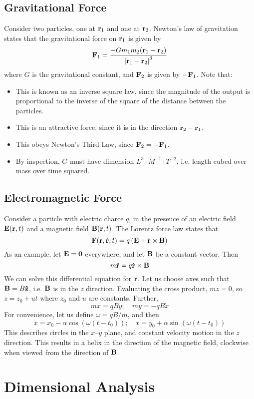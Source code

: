 \documentclass{article}
\begin{document}
\subsection{Gravitational Force}
Consider two particles, one at $\vb r_1$ and one at $\vb r_2$. Newton's law of gravitation states that the gravitational force on $\vb r_1$ is given by
\[ \vb F_1 = \frac{- G m_1 m_2 (\vb r_1 - \vb r_2)}{\abs{\vb r_1 - \vb r_2}^3} \]
where $G$ is the gravitational constant, and $\vb F_2$ is given by $-\vb F_1$. Note that:
\begin{itemize}
    \item This is known as an inverse square law, since the magnitude of the output is proportional to the inverse of the square of the distance between the particles.
    \item This is an attractive force, since it is in the direction $\vb r_2 - \vb r_1$.
    \item This obeys Newton's Third Law, since $\vb F_2 = - \vb F_1$.
    \item By inspection, $G$ must have dimension $L^3 \cdot M^{-1} \cdot T^{-2}$, i.e. length cubed over mass over time squared.
\end{itemize}

\subsection{Electromagnetic Force}
Consider a particle with electric charce $q$, in the presence of an electric field $\vb E(\vb r, t)$ and a magnetic field $\vb B(\vb r, t)$. The Lorentz force law states that
\[ \vb F(\vb r, \dot{\vb r}, t) = q\left( \vb E + \dot{\vb r} \times \vb B \right) \]
As an example, let $\vb E = \vb 0$ everywhere, and let $\vb B$ be a constant vector. Then
\[ m \ddot{\vb r} = q \dot{\vb r} \times \vb B \]
We can solve this differential equation for $\vb r$. Let us choose axes such that $\vb B = B \vu{z}$, i.e. $\vb B$ is in the $z$ direction. Evaluating the cross product, $m \ddot{z} = 0$, so $z = z_0 + ut$ where $z_0$ and $u$ are constants. Further,
\[ m \ddot x = qB\dot y;\quad m \ddot y = -qB\dot x \]
For convenience, let us define $\omega = qB/m$, and then
\[ x = x_0 - \alpha \cos(\omega(t - t_0));\quad x = y_0 + \alpha \sin(\omega(t - t_0)) \]
This describes circles in the $x$--$y$ plane, and constant velocity motion in the $z$ direction. This results in a helix in the direction of the magnetic field, clockwise when viewed from the direction of $\vb B$.

\section{Dimensional Analysis}
\end{document}
